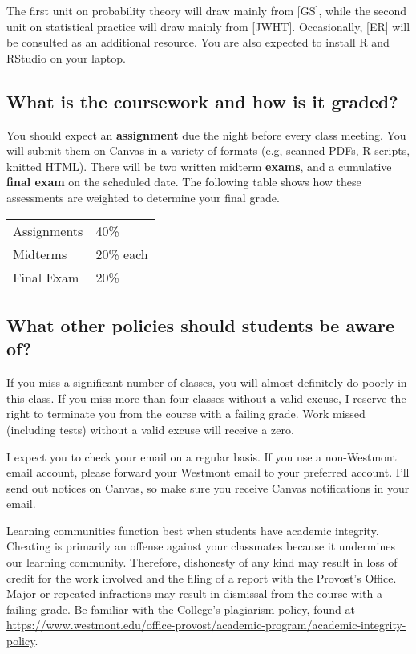 \documentclass[
  twoside]{article}
\begin{document}
The first unit on probability theory will draw mainly from {[}GS{]},
while the second unit on statistical practice will draw mainly from
{[}JWHT{]}. Occasionally, {[}ER{]} will be consulted as an additional
resource. You are also expected to install R and RStudio on your laptop.

\hypertarget{what-is-the-coursework-and-how-is-it-graded}{%
\subsection{What is the coursework and how is it
graded?}\label{what-is-the-coursework-and-how-is-it-graded}}

You should expect an \textbf{assignment} due the night before every
class meeting. You will submit them on Canvas in a variety of formats
(e.g, scanned PDFs, R scripts, knitted HTML). There will be two written
midterm \textbf{exams}, and a cumulative \textbf{final exam} on the
scheduled date. The following table shows how these assessments are
weighted to determine your final grade.

\begin{tabular}[t]{ll}
\toprule
Assignments & 40\%\\
Midterms & 20\% each\\
Final Exam & 20\%\\
\bottomrule
\end{tabular}

\hypertarget{what-other-policies-should-students-be-aware-of}{%
\subsection{What other policies should students be aware
of?}\label{what-other-policies-should-students-be-aware-of}}

If you miss a significant number of classes, you will almost definitely
do poorly in this class. If you miss more than four classes without a
valid excuse, I reserve the right to terminate you from the course with
a failing grade. Work missed (including tests) without a valid excuse
will receive a zero.

I expect you to check your email on a regular basis. If you use a
non-Westmont email account, please forward your Westmont email to your
preferred account. I'll send out notices on Canvas, so make sure you
receive Canvas notifications in your email.

Learning communities function best when students have academic
integrity. Cheating is primarily an offense against your classmates
because it undermines our learning community. Therefore, dishonesty of
any kind may result in loss of credit for the work involved and the
filing of a report with the Provost's Office. Major or repeated
infractions may result in dismissal from the course with a failing
grade. Be familiar with the College's plagiarism policy, found at
\url{https://www.westmont.edu/office-provost/academic-program/academic-integrity-policy}.
\end{document}
